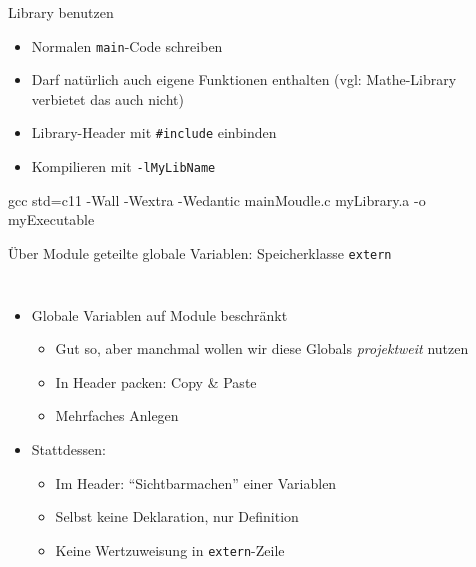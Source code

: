 
\begin{frame}[fragile]{Library benutzen}
%
\begin{itemize}
\item Normalen \texttt{main}-Code schreiben
\item Darf natürlich auch eigene Funktionen enthalten (vgl: Mathe-Library verbietet das auch nicht)
\item Library-Header mit \texttt{#include} einbinden
\item Kompilieren mit \texttt{-lMyLibName}
\end{itemize}
%
\begin{cmdbox}
\scriptsize
gcc std=c11 -Wall -Wextra -Wedantic mainMoudle.c {\color{cyan} myLibrary.a} -o myExecutable
\end{cmdbox}
%
\end{frame}


\begin{frame}[fragile]{Über Module geteilte globale Variablen: Speicherklasse \texttt{extern}}
%
\begin{columns}[T]
\begin{itemize}
\item Globale Variablen auf Module beschränkt
	\begin{itemize}
	\item Gut so, aber manchmal wollen wir diese Globals \emph{projektweit} nutzen
	\item In Header packen: Copy \& Paste 
	\item[\Thus] Mehrfaches Anlegen
	\end{itemize}
\item Stattdessen: 
	\begin{itemize}
	\item Im Header: \enquote{Sichtbarmachen} einer Variablen
	\item Selbst keine Deklaration, nur Definition
	\item Keine Wertzuweisung in \texttt{extern}-Zeile
	\end{itemize}
\end{itemize}
%
\begin{codebox}[Syntax]
\end{codebox}
\end{columns}
%
\end{frame}

